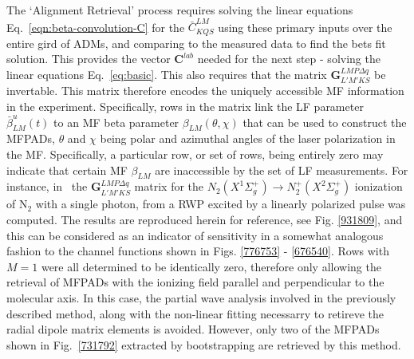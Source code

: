 \documentclass[10pt]{article}
\begin{document}
The `Alignment Retrieval' process requires solving the linear equations Eq.~\ref{eqn:beta-convolution-C} for the $\bar{C}^{LM}_{KQS}$ using these primary inputs over the entire gird of ADMs, and comparing to the measured data to find the bets fit solution. This provides the vector $\mathbf{C}^{lab}$ needed for the next step - solving the linear equations Eq.~\ref{eq:basic}. This also requires that the matrix $\mathbf{{G}}^{LMP\Delta q }_{L'M'KS}$ be invertable. This matrix therefore encodes the uniquely accessible MF information in the experiment. Specifically, rows in the matrix link the LF parameter $\bar{\beta}^u_{LM}(t)$  to an MF beta parameter $\beta_{LM}(\theta,\chi)$ that can be used to construct the MFPADs, $\theta$ and $\chi$ being polar and azimuthal angles of the laser polarization in the MF. Specifically, a particular row, or set of rows, being entirely zero may indicate that certain MF $\beta_{LM}$ are inaccessible by the set of LF measurements. For instance, in~\cite{gregory2021MolecularFramePhotoelectron} the $\mathbf{{G}}^{LMP\Delta q }_{L'M'KS}$ matrix for the $N_2(X^{1}\Sigma^{+}_{g}) \rightarrow N^+_2(X^{2}\Sigma^{+}_{g})$ ionization of N$_2$ with a single photon, from a RWP excited by a linearly polarized pulse was computed. The results are reproduced herein for reference, see Fig. \ref{931809}, and this can be considered as an indicator of sensitivity in a somewhat analogous fashion to the channel functions shown in Figs. \ref{776753} - \ref{676540}. Rows with $M = 1$ were all determined to be identically zero, therefore only allowing the retrieval of MFPADs with the ionizing field parallel and perpendicular to the molecular axis. In this case, the partial wave analysis involved in the previously described method, along with the non-linear fitting necessarry to retireve the radial dipole matrix elements is avoided. However, only two of the MFPADs shown in Fig.~\ref{731792} extracted by bootstrapping are retrieved by this method.\\
\end{document}

